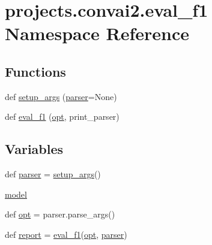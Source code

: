 \hypertarget{namespaceprojects_1_1convai2_1_1eval__f1}{}\section{projects.\+convai2.\+eval\+\_\+f1 Namespace Reference}
\label{namespaceprojects_1_1convai2_1_1eval__f1}
\subsection*{Functions}
\begin{DoxyCompactItemize}
\item 
def \hyperlink{namespaceprojects_1_1convai2_1_1eval__f1_a74826f78ce1ce6c9fe9b6d4a6297f3bd}{setup\+\_\+args} (\hyperlink{namespaceprojects_1_1convai2_1_1eval__f1_a6da11294e7d2ac208d4069e4b4edfe72}{parser}=None)
\item 
def \hyperlink{namespaceprojects_1_1convai2_1_1eval__f1_aac16a2ead8ff2b896c82411fe262f449}{eval\+\_\+f1} (\hyperlink{namespaceprojects_1_1convai2_1_1eval__f1_a57ea0872105b4863c523331ade8a705e}{opt}, print\+\_\+parser)
\end{DoxyCompactItemize}
\subsection*{Variables}
\begin{DoxyCompactItemize}
\item 
def \hyperlink{namespaceprojects_1_1convai2_1_1eval__f1_a6da11294e7d2ac208d4069e4b4edfe72}{parser} = \hyperlink{namespaceprojects_1_1convai2_1_1eval__f1_a74826f78ce1ce6c9fe9b6d4a6297f3bd}{setup\+\_\+args}()
\item 
\hyperlink{namespaceprojects_1_1convai2_1_1eval__f1_aeae95142bd810ef6bcc865a5ccb3c1b6}{model}
\item 
def \hyperlink{namespaceprojects_1_1convai2_1_1eval__f1_a57ea0872105b4863c523331ade8a705e}{opt} = parser.\+parse\+\_\+args()
\item 
def \hyperlink{namespaceprojects_1_1convai2_1_1eval__f1_ac8a7730e4bd30a9a12a7f83c3b6821fd}{report} = \hyperlink{namespaceprojects_1_1convai2_1_1eval__f1_aac16a2ead8ff2b896c82411fe262f449}{eval\+\_\+f1}(\hyperlink{namespaceprojects_1_1convai2_1_1eval__f1_a57ea0872105b4863c523331ade8a705e}{opt}, \hyperlink{namespaceprojects_1_1convai2_1_1eval__f1_a6da11294e7d2ac208d4069e4b4edfe72}{parser})
\end{DoxyCompactItemize}


